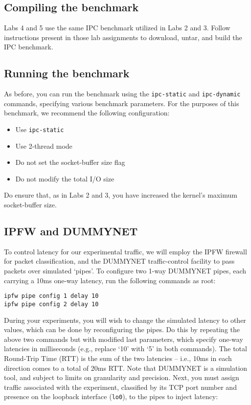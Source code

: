 \documentclass[a4paper,10pt]{article}
\begin{document}
\subsection*{Compiling the benchmark}

Labs 4 and 5 use the same IPC benchmark utilized in Labs 2 and 3.
Follow instructions present in those lab assignments to download, untar, and
build the IPC benchmark.

\subsection*{Running the benchmark}

As before, you can run the benchmark using the \texttt{ipc-static} and
\texttt{ipc-dynamic} commands, specifying various benchmark parameters.
For the purposes of this benchmark, we recommend the following configuration:

\begin{itemize}
\item Use \texttt{ipc-static}
\item Use 2-thread mode
\item Do not set the socket-buffer size flag
\item Do not modify the total I/O size
\end{itemize}

\noindent
Do ensure that, as in Labs 2 and 3, you have increased the kernel's maximum 
socket-buffer size.

\subsection*{IPFW and DUMMYNET}

To control latency for our experimental traffic, we will employ the IPFW
firewall for packet classification, and the DUMMYNET traffic-control facility
to pass packets over simulated `pipes'.
To configure two 1-way DUMMYNET pipes, each carrying a 10ms one-way latency,
run the following commands as root:

\begin{verbatim}
ipfw pipe config 1 delay 10
ipfw pipe config 2 delay 10
\end{verbatim}

\noindent
During your experiments, you will wish to change the simulated latency to
other values, which can be done by reconfiguring the pipes.
Do this by repeating the above two commands but with modified last parameters,
which specify one-way latencies in milliseconds (e.g., replace `10' with `5'
in both commands).
The total Round-Trip Time (RTT) is the sum of the two latencies -- i.e., 10ms
in each direction comes to a total of 20ms RTT.
Note that DUMMYNET is a simulation tool, and subject to limits on granularity
and precision.
Next, you must assign traffic associated with the experiment, classified by
its TCP port number and presence on the loopback interface (\texttt{lo0}), to
the pipes to inject latency:
\end{document}
